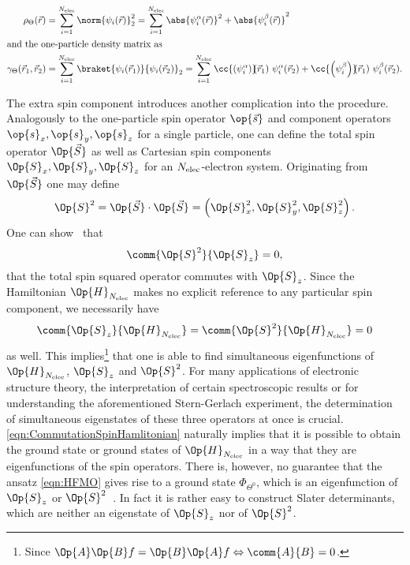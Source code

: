 \begin{rem}
	\begin{align}
		\rho_\Theta(\vec{r}) &= \sum_{i=1}^{\Nelec} \norm{\psi_i(\vec{r})}_2^2
		= \sum_{i=1}^{\Nelec} \abs{\psi_i^\alpha(\vec{r})}^2 + \abs{\psi_i^\beta(\vec{r})}^2 \\
	\intertext{and the one-particle density matrix as}
		\gamma_\Theta(\vec{r}_1,\vec{r}_2)
		&= \sum_{i=1}^{\Nelec} \braket{\psi_i(\vec{r}_1)}{\psi_i(\vec{r}_2)}_2
		= \sum_{i=1}^{\Nelec} \cc{\left(\psi_i^\alpha\right)}\!\!(\vec{r}_1)\  \psi_i^\alpha(\vec{r}_2)
			+ \cc{\left(\psi_i^\beta\right)}\!\!(\vec{r}_1)\  \psi_i^\beta(\vec{r}_2).
	\end{align}

	The extra spin component introduces another complication
	into the \HF procedure.
	Analogously to the one-particle spin operator $\op{\vec{s}}$
	and component operators $\op{s}_x, \op{s}_y, \op{s}_z$
	for a single particle,
	one can define the total spin operator $\Op{\vec{S}}$
	as well as Cartesian spin components $\Op{S}_x, \Op{S}_y, \Op{S}_z$
	for an $N_\text{elec}$-electron system.
	Originating from $\Op{\vec{S}}$ one may define
	\[ \Op{S}^2 = \Op{\vec{S}} \cdot \Op{\vec{S}} = \left(\Op{S}^2_x, \Op{S}^2_y, \Op{S}^2_z\right). \]
	One can show~\cite{Shankar1994} that
	\[ \comm{\Op{S}^2}{\Op{S}_z} = 0, \]
	\ie that the total spin squared operator commutes with $\Op{S}_z$.
	Since the Hamiltonian $\Op{H}_{\Nelec}$ makes no explicit reference
	to any particular spin component,
	we necessarily have
	\begin{equation}
		\comm{\Op{S}_z}{\Op{H}_{\Nelec}} = \comm{\Op{S}^2}{\Op{H}_{\Nelec}} = 0
		\label{eqn:CommutationSpinHamlitonian}
	\end{equation}
	as well.
	This implies\footnote{%
		Since $\Op{A}\Op{B} f = \Op{B}\Op{A} f \Leftrightarrow \comm{A}{B} = 0$.%
	}
	that one is able to find simultaneous eigenfunctions of $\Op{H}_{\Nelec}$,
	$\Op{S}_z$ and $\Op{S}^2$.
	For many applications of electronic structure theory,
	\eg the interpretation of certain spectroscopic results
	or for understanding the aforementioned Stern-Gerlach experiment,
	the determination of simultaneous eigenstates of these three operators at once
	is crucial.
	\eqref{eqn:CommutationSpinHamlitonian}
	naturally implies that it is possible to obtain the ground state
	or ground states of $\Op{H}_{\Nelec}$
	in a way that they are eigenfunctions of the spin operators.
	There is, however, no guarantee that the \HF ansatz
	\eqref{eqn:HFMO} gives rise to a \HF ground state $\Phi_{\Theta^0}$,
	which is an eigenfunction of $\Op{S}_z$ or $\Op{S}^2$~\cite{Fukutome1981,McWeeny1985}.
	In fact it is rather easy to construct Slater determinants,
	which are neither an eigenstate of $\Op{S}_z$ nor of $\Op{S}^2$.


\end{rem}
